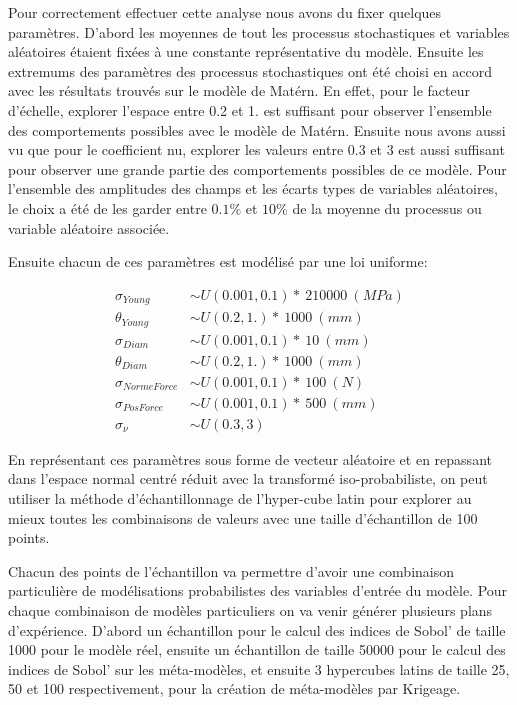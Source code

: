 \documentclass[a4paper,10pt]{article}
\begin{document}
Pour correctement effectuer cette analyse nous avons du fixer quelques paramètres. D'abord les moyennes de tout les processus stochastiques et variables aléatoires étaient fixées à une constante représentative du modèle. Ensuite les extremums des paramètres des processus stochastiques ont été choisi en accord avec les résultats trouvés sur le modèle de Matérn. En effet, pour le facteur d'échelle, explorer l'espace entre 0.2 et 1. est suffisant pour observer l'ensemble des comportements possibles avec le modèle de Matérn. Ensuite nous avons aussi vu que pour le coefficient nu, explorer les valeurs entre 0.3 et 3 est aussi suffisant pour observer une grande partie des comportements possibles de ce modèle. Pour l'ensemble des amplitudes des champs et les écarts types de variables aléatoires, le choix a été de les garder entre $0.1\%$ et $10\%$ de la moyenne du processus ou variable aléatoire associée. \par \smallskip
Ensuite chacun de ces paramètres est modélisé par une loi uniforme:

\begin{align*}
\sigma_{Young}      & \sim U(0.001, 0.1) *\ 210000\ (MPa) \\
\theta_{Young}      & \sim U(0.2, 1.)    *\ 1000\   (mm)  \\
\sigma_{Diam}       & \sim U(0.001, 0.1) *\ 10\     (mm)  \\
\theta_{Diam}       & \sim U(0.2, 1.)    *\ 1000\   (mm)  \\
\sigma_{NormeForce} & \sim U(0.001, 0.1) *\ 100\    (N)   \\
\sigma_{PosForce}   & \sim U(0.001, 0.1) *\ 500\    (mm)  \\
\sigma_{\nu} 		& \sim U(0.3, 3) 
\end{align*}

En représentant ces paramètres sous forme de vecteur aléatoire et en repassant dans l'espace normal centré réduit avec la transformé iso-probabiliste, on peut utiliser la méthode d’échantillonnage de l'hyper-cube latin pour explorer au mieux toutes les combinaisons de valeurs avec une taille d’échantillon de 100 points. \par \smallskip

Chacun des points de l'échantillon va permettre d'avoir une combinaison particulière de modélisations probabilistes des variables d'entrée du modèle. Pour chaque combinaison de modèles particuliers on va venir générer plusieurs plans d’expérience. D'abord un échantillon pour le calcul des indices de Sobol' de taille 1000 pour le modèle réel, ensuite un échantillon de taille 50000 pour le calcul des indices de Sobol' sur les méta-modèles, et ensuite 3 hypercubes latins de taille 25, 50 et 100 respectivement, pour la création de méta-modèles par Krigeage. \par \smallskip
\end{document}
